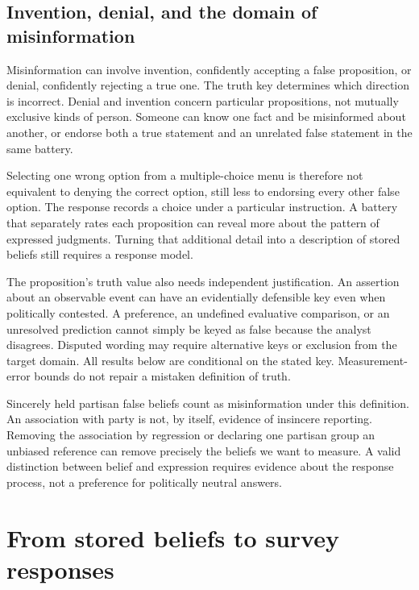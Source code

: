 \documentclass[11pt]{article}
\begin{document}
\subsection{Invention, denial, and the domain of misinformation}

Misinformation can involve invention, confidently accepting a false proposition, or denial, confidently rejecting a true one. The truth key determines which direction is incorrect. Denial and invention concern particular propositions, not mutually exclusive kinds of person. Someone can know one fact and be misinformed about another, or endorse both a true statement and an unrelated false statement in the same battery.

Selecting one wrong option from a multiple-choice menu is therefore not equivalent to denying the correct option, still less to endorsing every other false option. The response records a choice under a particular instruction. A battery that separately rates each proposition can reveal more about the pattern of expressed judgments. Turning that additional detail into a description of stored beliefs still requires a response model.

The proposition's truth value also needs independent justification. An assertion about an observable event can have an evidentially defensible key even when politically contested. A preference, an undefined evaluative comparison, or an unresolved prediction cannot simply be keyed as false because the analyst disagrees. Disputed wording may require alternative keys or exclusion from the target domain. All results below are conditional on the stated key. Measurement-error bounds do not repair a mistaken definition of truth.

Sincerely held partisan false beliefs count as misinformation under this definition. An association with party is not, by itself, evidence of insincere reporting. Removing the association by regression or declaring one partisan group an unbiased reference can remove precisely the beliefs we want to measure. A valid distinction between belief and expression requires evidence about the response process, not a preference for politically neutral answers.

\section{From stored beliefs to survey responses}
\end{document}
